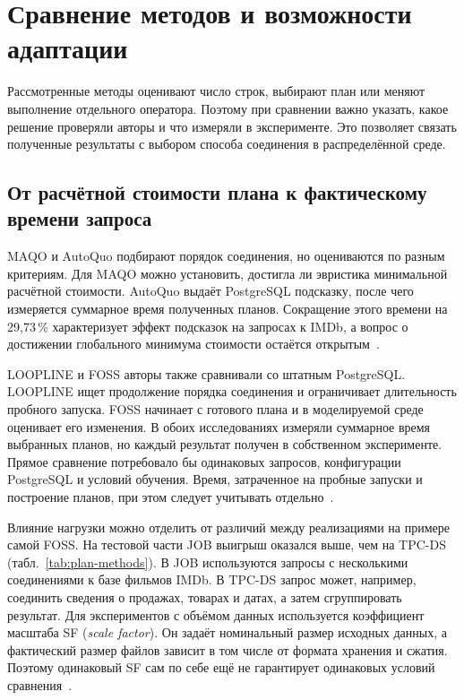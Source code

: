 \documentclass[a4paper, final]{article}
\begin{document}
	
	\newpage
	\section{Сравнение методов и возможности адаптации}
	
	Рассмотренные методы оценивают число строк, выбирают план или меняют выполнение отдельного оператора. Поэтому при сравнении важно указать, какое решение проверяли авторы и что измеряли в эксперименте. Это позволяет связать полученные результаты с выбором способа соединения в распределённой среде.
	
	\subsection{От расчётной стоимости плана к фактическому времени запроса}
	
	MAQO и AutoQuo подбирают порядок соединения, но оцениваются по разным критериям. Для MAQO можно установить, достигла ли эвристика минимальной расчётной стоимости. AutoQuo выдаёт PostgreSQL подсказку, после чего измеряется суммарное время полученных планов. Сокращение этого времени на 29,73\,\% характеризует эффект подсказок на запросах к IMDb, а вопрос о достижении глобального минимума стоимости остаётся открытым~\cite{goncalves2014,autoquo2024}.
	
	LOOPLINE и FOSS авторы также сравнивали со штатным PostgreSQL. LOOPLINE ищет продолжение порядка соединения и ограничивает длительность пробного запуска. FOSS начинает с готового плана и в моделируемой среде оценивает его изменения. В обоих исследованиях измеряли суммарное время выбранных планов, но каждый результат получен в собственном эксперименте. Прямое сравнение потребовало бы одинаковых запросов, конфигурации PostgreSQL и условий обучения. Время, затраченное на пробные запуски и построение планов, при этом следует учитывать отдельно~\cite{loopline2025,foss2024}.
	
	Влияние нагрузки можно отделить от различий между реализациями на примере самой FOSS. На тестовой части JOB выигрыш оказался выше, чем на TPC-DS (табл.~\ref{tab:plan-methods}). В JOB используются запросы с несколькими соединениями к базе фильмов IMDb. В TPC-DS запрос может, например, соединить сведения о продажах, товарах и датах, а затем сгруппировать результат. Для экспериментов с объёмом данных используется коэффициент масштаба SF (\textit{scale factor}). Он задаёт номинальный размер исходных данных, а фактический размер файлов зависит в том числе от формата хранения и сжатия. Поэтому одинаковый SF сам по себе ещё не гарантирует одинаковых условий сравнения~\cite{leis2015,foss2024,turkmen2026}.
	
\end{document}
